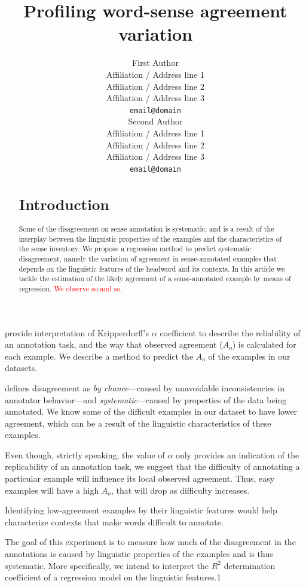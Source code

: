 \documentclass[11pt,a4paper]{article}
\title{Profiling word-sense agreement variation}
\author{First Author \\
  Affiliation / Address line 1 \\
  Affiliation / Address line 2 \\
  Affiliation / Address line 3 \\
  {\tt email@domain} \\\And
  Second Author \\
  Affiliation / Address line 1 \\
  Affiliation / Address line 2 \\
  Affiliation / Address line 3 \\
  {\tt email@domain} \\}
\date{}
\begin{document}
\maketitle
\begin{abstract}
\section{Introduction}

Some of the disagreement on sense annotation is systematic, and is a result of the interplay between the linguistic properties of the examples and the characteristics of the sense inventory. We propose a regression method to predict systematic disagreement, namely the variation of agreement in sense-annotated examples that depends on the linguistic features of the headword and its contexts.
 In this article we tackle the estimation of the likely agreement of a sense-annotated example by means of regression. \textcolor{red}{ We observe so and so}. 
\end{abstract}

\cite{Artstein2008} provide interpretation of Kripperdorff's $\alpha$ coefficient to describe the reliability of an annotation task, and the way that observed agreement ($A_o$) is calculated for each example. We describe a method to predict the $A_o$ of the examples in our datasets. 

\cite{krippendorff2011} defines disagreement as \textit{by chance}---caused by unavoidable inconsistencies in annotator behavior---and \textit{systematic}---caused by properties of the data being annotated. We know some of the difficult examples in our dataset to have lower agreement, which can be a result of the linguistic characteristics of these examples.

Even though, strictly speaking, the value of $\alpha$ only provides an indication of the replicability of an annotation task, we suggest that the difficulty of annotating a particular example will influence its local observed agreement. Thus, easy examples will have a high $A_o$, that will drop as difficulty increases. 

Identifying low-agreement examples by their linguistic features would help characterize contexts that make words difficult to annotate.


The goal of this experiment is to measure how much of the disagreement in the annotations is caused by linguistic properties of the examples and is thus systematic. More specifically, we intend to interpret the $R^2$ determination coefficient of a regression model on the linguistic features.1
\end{document}
